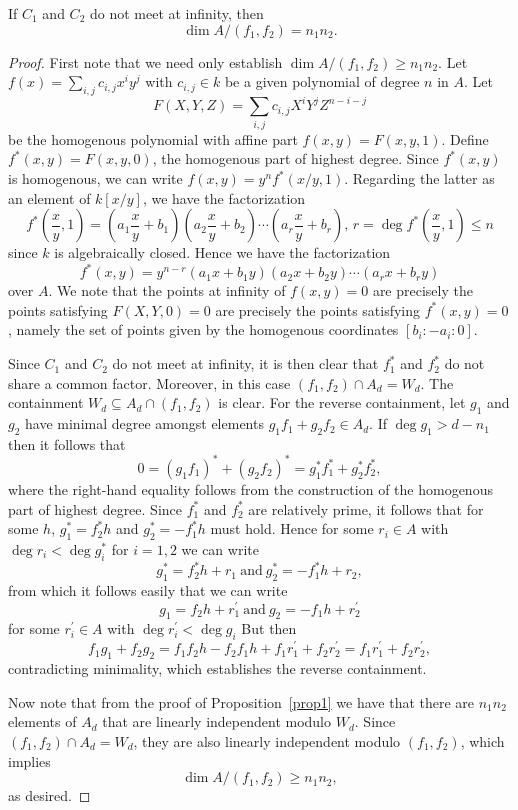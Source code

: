 \documentclass[10pt]{amsart}
\begin{document}
\begin{prop}\label{prop2}
  If $C_1$ and $C_2$ do not meet at infinity, then
  $$\dim A /(f_1,f_2) = n_1n_2.$$

  \begin{proof}
    First note that we need only establish $\dim A/(f_1, f_2) \geq n_1n_2$.
    Let $f(x) = \sum_{i,j} c_{i,j}x^iy^j$ with $c_{i,j} \in k$ be a given polynomial of degree $n$ in $A$.
    Let 
    $$F(X,Y,Z) = \sum_{i,j}c_{i,j}X^iY^jZ^{n - i - j}$$
    be the homogenous polynomial with affine part $f(x,y) = F(x,y,1)$.
    Define $f^*(x,y) = F(x,y,0)$, the homogenous part of highest degree.
    Since $f^*(x,y)$ is homogenous, we can write $f(x,y) = y^nf^*(x/y, 1)$.
    Regarding the latter as an element of $k\left[x/y\right]$, we have the factorization 
    $$f^*\left(\frac{x}{y}, 1\right) = \left(a_1\frac{x}{y} + b_1\right)\left(a_2\frac{x}{y} + b_2\right)\cdots\left(a_r\frac{x}{y} + b_r\right),\, r = \deg{f^*\left(\frac{x}{y}, 1\right)} \leq n$$		
    since $k$ is algebraically closed.
    Hence we have the factorization
    $$f^*(x,y) = y^{n-r}(a_1x + b_1y)(a_2x + b_2y)\cdots(a_rx + b_ry)$$
    over $A$.
    We note that the points at infinity of $f(x,y) = 0$ are precisely the points satisfying $F(X,Y,0) = 0$ are precisely the points satisfying $f^*(x,y) = 0$, namely the set of points given by the homogenous coordinates $[b_i : -a_i : 0]$.
    
    Since $C_1$ and $C_2$ do not meet at infinity, it is then clear that $f_1^*$ and $f_2^*$ do not share a common factor.
    Moreover, in this case $(f_1, f_2) \cap A_d = W_d$.
    The containment $W_d \subseteq A_d \cap (f_1, f_2)$ is clear.
    For the reverse containment, let $g_1$ and $g_2$ have minimal degree amongst elements $g_1f_1 + g_2f_2 \in A_d$.
    If $\deg{g_1} > d - n_1$ then it follows that
    $$0 = (g_1f_1)^* + (g_2f_2)^* = g_1^*f_1^* + g_2^*f_2^*,$$
    where the right-hand equality follows from the construction of the homogenous part of highest degree.
    Since $f_1^*$ and $f_2^*$ are relatively prime, it follows that for some $h$, $g_1^* = f_2^*h$ and $g_2^* = -f_1^*h$ must hold.
    Hence for some $r_i \in A$ with $\deg{r_i} < \deg{g_i^*}$ for $i = 1,2$ we can write
    $$g_1^* = f_2^*h + r_1\ \text{and}\ g_2^* = -f_1^*h + r_2,$$
    from which it follows easily that we can write 
    $$g_1 = f_2h + r_1^\prime\ \text{and}\ g_2 = -f_1h + r_2^\prime$$
    for some $r_i^\prime \in A$ with $\deg{r_i^\prime} < \deg{g_i}$
    But then
    $$f_1g_1 + f_2g_2 = f_1f_2h - f_2f_1h + f_1r_1^\prime + f_2r_2^\prime = f_1r_1^\prime + f_2r_2^\prime,$$
    contradicting minimality, which establishes the reverse containment.

    Now note that from the proof of Proposition~\ref{prop1} we have that there are $n_1n_2$ elements of $A_d$ that are linearly independent modulo $W_d$.
    Since $(f_1, f_2) \cap A_d = W_d$, they are also linearly independent modulo $(f_1, f_2)$, which implies
    $$\dim A/(f_1,f_2) \geq n_1n_2,$$
    as desired.
  \end{proof}
\end{prop}
\end{document}
